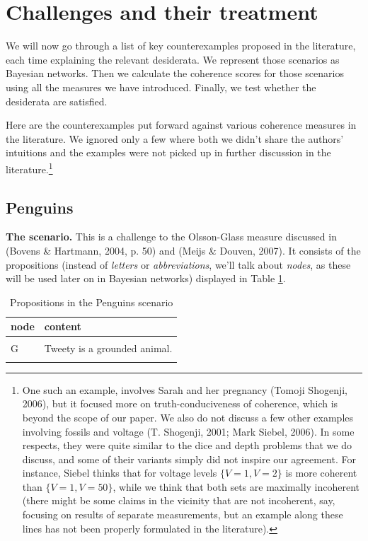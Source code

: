 \documentclass[
  10pt,
]{scrartcl}
\begin{document}
\hypertarget{challenges-and-their-treatment}{%
\section{\texorpdfstring{Challenges and their treatment \label{sec:examples}}{Challenges and their treatment }}\label{challenges-and-their-treatment}}

We will now go through a list of key counterexamples proposed in the literature, each time explaining the relevant desiderata. We represent those scenarios as Bayesian networks. Then we calculate the coherence scores for those scenarios using all the measures we have introduced. Finally, we test whether the desiderata are satisfied.

Here are the counterexamples put forward against various coherence measures in the literature. We ignored only a few where both we didn't share the authors' intuitions and the examples were not picked up in further discussion in the literature.\footnote{One such an example, involves
  Sarah and her pregnancy (Tomoji Shogenji, 2006), but it focused more
  on truth-conduciveness of coherence, which is beyond the scope of our
  paper. We also do not discuss a few other examples involving fossils
  and voltage (T. Shogenji, 2001; Mark Siebel, 2006). In some respects,
  they were quite similar to the dice and depth problems that we do
  discuss, and some of their variants simply did not inspire our
  agreement. For instance, Siebel thinks that for voltage levels
  \(\{V=1, V=2\}\) is more coherent than \(\{V=1, V=50\}\), while we
  think that both sets are maximally incoherent (there might be some
  claims in the vicinity that are not incoherent, say, focusing on
  results of separate measurements, but an example along these lines has
  not been properly formulated in the literature).}

\hypertarget{penguins}{%
\subsection{Penguins}\label{penguins}}

\textbf{The scenario.} This is a challenge to the Olsson-Glass measure discussed in (Bovens \& Hartmann, 2004, p. 50) and (Meijs \& Douven, 2007). It consists of the propositions (instead of \emph{letters} or \emph{abbreviations}, we'll talk about \emph{nodes}, as these will be used later on in Bayesian networks) displayed in Table \ref{tab:penguinsPropositions}.

\begin{table}[H]

\caption{\label{tab:penguinsPropositions}Propositions in the Penguins scenario}
\centering
\begin{tabular}[t]{ll}
\toprule
node & content\\
\midrule
\cellcolor{gray!6}{B} & \cellcolor{gray!6}{Tweety is a bird.}\\
G & Tweety is a grounded animal.\\
\cellcolor{gray!6}{P} & \cellcolor{gray!6}{Tweety is a penguin.}\\
\bottomrule
\end{tabular}
\end{table}
\end{document}
